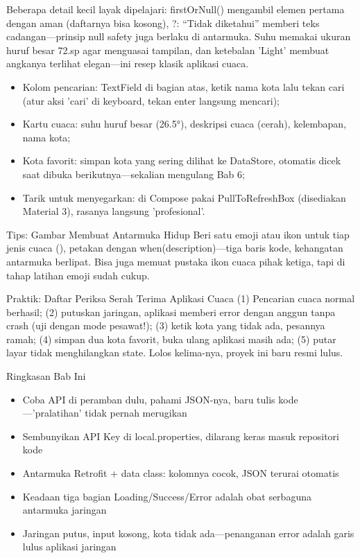 Beberapa detail kecil layak dipelajari: firstOrNull() mengambil elemen pertama dengan aman (daftarnya bisa kosong), ?: “Tidak diketahui” memberi teks cadangan—prinsip null safety juga berlaku di antarmuka. Suhu memakai ukuran huruf besar 72.sp agar menguasai tampilan, dan ketebalan 'Light' membuat angkanya terlihat elegan—ini resep klasik aplikasi cuaca.



\begin{itemize}
  \item Kolom pencarian: TextField di bagian atas, ketik nama kota lalu tekan cari (atur aksi 'cari' di keyboard, tekan enter langsung mencari);
  \item Kartu cuaca: suhu huruf besar (26.5°), deskripsi cuaca (cerah), kelembapan, nama kota;
  \item Kota favorit: simpan kota yang sering dilihat ke DataStore, otomatis dicek saat dibuka berikutnya—sekalian mengulang Bab 6;
  \item Tarik untuk menyegarkan: di Compose pakai PullToRefreshBox (disediakan Material 3), rasanya langsung 'profesional'.
\end{itemize}

\begin{tcbinfo}{Tips: Gambar Membuat Antarmuka Hidup}
Beri satu emoji atau ikon untuk tiap jenis cuaca (), petakan dengan when(description)—tiga baris kode, kehangatan antarmuka berlipat. Bisa juga memuat pustaka ikon cuaca pihak ketiga, tapi di tahap latihan emoji sudah cukup.

\end{tcbinfo}

\begin{tcbpractice}{Praktik: Daftar Periksa Serah Terima Aplikasi Cuaca}
(1) Pencarian cuaca normal berhasil; (2) putuskan jaringan, aplikasi memberi error dengan anggun tanpa crash (uji dengan mode pesawat!); (3) ketik kota yang tidak ada, pesannya ramah; (4) simpan dua kota favorit, buka ulang aplikasi masih ada; (5) putar layar tidak menghilangkan state. Lolos kelima-nya, proyek ini baru resmi lulus.

\end{tcbpractice}

\begin{tcbsummary}{Ringkasan Bab Ini}
\begin{itemize}
  \item Coba API di peramban dulu, pahami JSON-nya, baru tulis kode—'pralatihan' tidak pernah merugikan
  \item Sembunyikan API Key di local.properties, dilarang keras masuk repositori kode
  \item Antarmuka Retrofit + data class: kolomnya cocok, JSON terurai otomatis
  \item Keadaan tiga bagian Loading/Success/Error adalah obat serbaguna antarmuka jaringan
  \item Jaringan putus, input kosong, kota tidak ada—penanganan error adalah garis lulus aplikasi jaringan
\end{itemize}

\end{tcbsummary}
